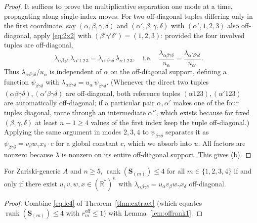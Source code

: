\begin{proof}
It suffices to prove the multiplicative separation one mode at a time, propagating along
single-index moves. For two off-diagonal tuples differing only in the first coordinate,
say $(\alpha,\beta,\gamma,\delta)$ and $(\alpha',\beta,\gamma,\delta)$ with
$(\alpha',1,2,3)$ also off-diagonal, apply \eqref{eq:2x2} with
$(\beta'\gamma'\delta')=(1,2,3)$: provided the four involved tuples are off-diagonal,
\begin{equation}\label{eq:propagate}
\lambda_{\alpha\beta\gamma\delta}\,\lambda_{\alpha'\,1\,2\,3}
=\lambda_{\alpha'\beta\gamma\delta}\,\lambda_{\alpha\,1\,2\,3},
\quad\text{i.e.}\quad
\frac{\lambda_{\alpha\beta\gamma\delta}}{u_\alpha}
=\frac{\lambda_{\alpha'\beta\gamma\delta}}{u_{\alpha'}}.
\end{equation}
Thus $\lambda_{\alpha\beta\gamma\delta}/u_\alpha$ is independent of $\alpha$ on the
off-diagonal support, defining a function $\psi_{\beta\gamma\delta}$ with
$\lambda_{\alpha\beta\gamma\delta}=u_\alpha\,\psi_{\beta\gamma\delta}$. (Whenever the
direct two tuples $(\alpha\beta\gamma\delta),(\alpha'\beta\gamma\delta)$ are off-diagonal,
both reference tuples $(\alpha 123),(\alpha'123)$ are automatically off-diagonal; if a
particular pair $\alpha,\alpha'$ makes one of the four tuples diagonal, route through an
intermediate $\alpha''$, which exists because for fixed $(\beta,\gamma,\delta)$ at least
$n-1\ge4$ values of the first index keep the tuple off-diagonal.) Applying the same
argument in modes $2,3,4$ to $\psi_{\beta\gamma\delta}$ separates it as
$\psi_{\beta\gamma\delta}=v_\beta w_\gamma x_\delta\cdot c$ for a global constant $c$,
which we absorb into $u$. All factors are nonzero because $\lambda$ is nonzero on its
entire off-diagonal support. This gives (b).
\end{proof}

\begin{theorem}[Characterisation]\label{thm:char}
For Zariski-generic $A$ and $n\ge5$, $\operatorname{rank}(\mathbf S_{(m)})\le4$ for all
$m\in\{1,2,3,4\}$ if and only if there exist $u,v,w,x\in(\mathbb R^*)^n$ with
$\lambda_{\alpha\beta\gamma\delta}=u_\alpha v_\beta w_\gamma x_\delta$ off-diagonal.
\end{theorem}

\begin{proof}
Combine \eqref{eq:le4} of Theorem~\ref{thm:extract} (which equates
$\operatorname{rank}(\mathbf S_{(m)})\le4$ with $r_m^{\mathrm{off}}\le1$) with
Lemma~\ref{lem:offrank1}.
\end{proof}

